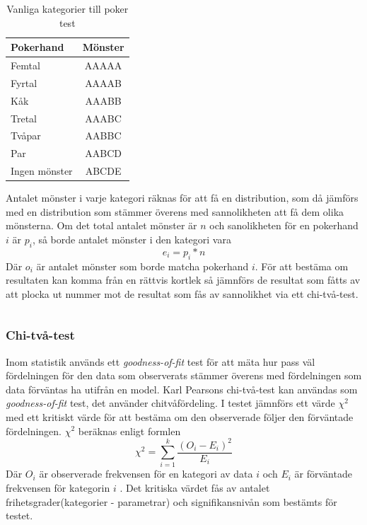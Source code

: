 \documentclass[swedish,a4paper]{article}
\begin{document}
\begin{table}[H] %
	\centering
        \caption{Vanliga kategorier till poker test}
        \label{tab:num_poker_hands}
	\begin{tabular}{|l|c|}
	\hline 
	Pokerhand & Mönster \\ \hline  
	Femtal & AAAAA \\ \hline
	Fyrtal & AAAAB \\ \hline
	Kåk & AAABB \\ \hline
	Tretal & AAABC \\ \hline
	Tvåpar & AABBC \\ \hline
	Par & AABCD \\ \hline
    Ingen mönster & ABCDE \\ \hline
	
\end{tabular}

\end{table}

 Antalet mönster i varje kategori räknas för att få en distribution, som
 då jämförs med en distribution som stämmer överens med sannolikheten
 att få dem olika mönsterna. Om det total antalet mönster är $n$ och
 sanolikheten för en pokerhand $i$ är $p_i$, så borde antalet mönster i
 den kategori vara $$e_i = p_i * n$$ Där $o_i$ är antalet mönster som
 borde matcha pokerhand $i$. För att bestäma om resultaten kan komma
 från en rättvis kortlek så jämnförs de resultat som fåtts av att plocka
 ut nummer mot de resultat som fås av sannolikhet via ett chi-två-test.

\begin{equation*}
\end{equation*}

\subsubsection{Chi-två-test}
\label{sec:chi_square}
Inom statistik används ett \textit{goodness-of-fit} test för att mäta
hur pass väl fördelningen för den data som observerats stämmer överens
med fördelningen som data förväntas ha utifrån en model. Karl Pearsons
chi-två-test kan användas som \textit{goodness-of-fit} test, det
använder chitvåfördeling. I testet jämnförs ett värde $\chi^2$ med ett
kritiskt värde för att bestäma om den observerade följer den förväntade
fördelningen. $\chi^2$ beräknas enligt formlen
$$\chi^2 = \sum_{i=1}^k\frac{(O_i - E_i)^2}{E_i}$$
Där $O_i$ är observerade frekvensen för en kategori av data $i$ och $E_i$
är förväntade frekvensen för kategorin $i$ \parencite{nist}.
Det kritiska värdet fås av antalet frihetsgrader(kategorier - parametrar)
och signifikansnivån som bestämts för testet.
\end{document}
